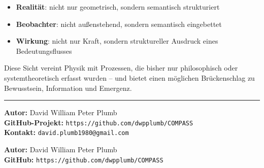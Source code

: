 \documentclass[11pt]{article}
\begin{document}
\begin{itemize}
  \item \textbf{Realität}: nicht nur geometrisch, sondern semantisch strukturiert
  \item \textbf{Beobachter}: nicht außenstehend, sondern semantisch eingebettet
  \item \textbf{Wirkung}: nicht nur Kraft, sondern struktureller Ausdruck eines Bedeutungsflusses
\end{itemize}

Diese Sicht vereint Physik mit Prozessen, die bisher nur philosophisch oder systemtheoretisch erfasst wurden --  
und bietet einen möglichen Brückenschlag zu Bewusstsein, Information und Emergenz.


\vspace{1cm}
\hrule
\vspace{0.3cm}
\noindent
\textbf{Autor:} David William Peter Plumb \\
\textbf{GitHub-Projekt:} \texttt{https://github.com/dwpplumb/COMPASS} \\
\textbf{Kontakt:} \texttt{david.plumb1980@gmail.com}

\vspace{0.3cm}
\noindent \textbf{Autor:} David William Peter Plumb\\
\textbf{GitHub:} \texttt{https://github.com/dwpplumb/COMPASS}
\end{document}
